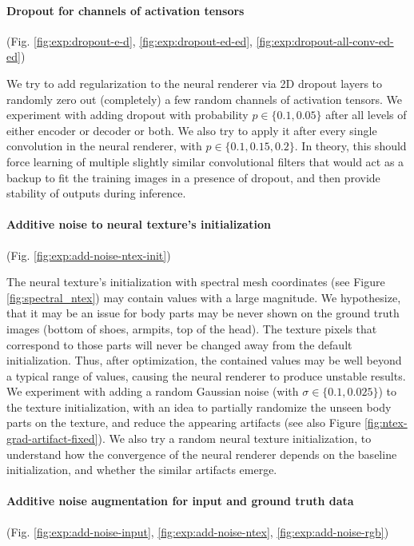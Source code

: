 \vspace{-15pt}\paragraph{Dropout for channels of activation tensors}(Fig. \ref{fig:exp:dropout-e-d}, \ref{fig:exp:dropout-ed-ed}, \ref{fig:exp:dropout-all-conv-ed-ed})\mbox{}\nopagebreak

We try to add regularization to the neural renderer via 2D dropout layers \cite{aux:dropout2d-15} to randomly zero out (completely) a few random channels of activation tensors. We experiment with adding dropout with probability $p \in \{0.1, 0.05\}$ after all levels of either encoder or decoder or both. We also try to apply it after every single convolution in the neural renderer, with $p \in \{0.1, 0.15, 0.2\}$. In theory, this should force learning of multiple slightly similar convolutional filters that would act as a backup to fit the training images in a presence of dropout, and then provide stability of outputs during inference.

\vspace{-15pt}\paragraph{Additive noise to neural texture's initialization}(Fig. \ref{fig:exp:add-noise-ntex-init})\mbox{}\nopagebreak

The neural texture's initialization with spectral mesh coordinates (see Figure \ref{fig:spectral_ntex}) may contain values with a large magnitude. We hypothesize, that it may be an issue for body parts may be never shown on the ground truth images (bottom of shoes, armpits, top of the head). The texture pixels that correspond to those parts will never be changed away from the default initialization. Thus, after optimization, the contained values may be well beyond a typical range of values, causing the neural renderer to produce unstable results. We experiment with adding a random Gaussian noise (with $\sigma\in\{0.1, 0.025\}$) to the texture initialization, with an idea to partially randomize the unseen body parts on the texture, and reduce the appearing artifacts (see also Figure \ref{fig:ntex-grad-artifact-fixed}). We also try a random neural texture initialization, to understand how the convergence of the neural renderer depends on the baseline initialization, and whether the similar artifacts emerge.

\vspace{-15pt}\paragraph{Additive noise augmentation for input and ground truth data}(Fig. \ref{fig:exp:add-noise-input}, \ref{fig:exp:add-noise-ntex}, \ref{fig:exp:add-noise-rgb})\mbox{}\nopagebreak

